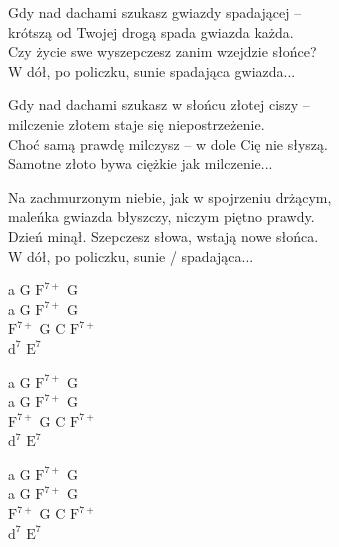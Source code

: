 \begin{text}
    Gdy nad dachami szukasz gwiazdy spadającej –\\
    krótszą od Twojej drogą spada gwiazda każda.\\
    Czy życie swe wyszepczesz zanim wzejdzie słońce?\\
    W dół, po policzku, sunie spadająca gwiazda...

    Gdy nad dachami szukasz w słońcu złotej ciszy –\\
    milczenie złotem staje się niepostrzeżenie.\\
    Choć samą prawdę milczysz – w dole Cię nie słyszą.\\
    Samotne złoto bywa ciężkie jak milczenie...

    Na zachmurzonym niebie, jak w spojrzeniu drżącym,\\
    maleńka gwiazda błyszczy, niczym piętno prawdy.\\
    Dzień minął. Szepczesz słowa, wstają nowe słońca.\\
    W dół, po policzku, sunie / spadająca...
\end{text}
\begin{chord}
    a G $\mathrm{F^{7+}}$ G\\
    a G $\mathrm{F^{7+}}$ G\\
    $\mathrm{F^{7+}}$ G C $\mathrm{F^{7+}}$\\
    $\mathrm{d^7}$ $\mathrm{E^7}$

    a G $\mathrm{F^{7+}}$ G\\
    a G $\mathrm{F^{7+}}$ G\\
    $\mathrm{F^{7+}}$ G C $\mathrm{F^{7+}}$\\
    $\mathrm{d^7}$ $\mathrm{E^7}$

    a G $\mathrm{F^{7+}}$ G\\
    a G $\mathrm{F^{7+}}$ G\\
    $\mathrm{F^{7+}}$ G C $\mathrm{F^{7+}}$\\
    $\mathrm{d^7}$ $\mathrm{E^7}$
\end{chord}

